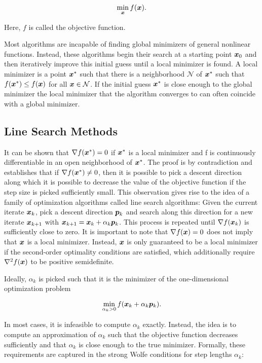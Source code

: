 \[
    \min_{\bm{x}} f(\bm{x}).
\]

\noindent Here, $f$ is called the objective function. 

Most algorithms are incapable of finding global minimizers of general nonlinear functions. 
Instead, these algorithms begin their search at a starting point $\bm{x}_0$ and then iteratively improve this initial guess until a local 
minimizer is found. A local minimizer is a point $\bm{x}^*$ such that there is a neighborhood $\mathcal{N}$ of 
$\bm{x}^*$ such that $f(\bm{x}^*) \leq f(\bm{x})$ for all $\bm{x} \in \mathcal{N}$. If the initial guess $\bm{x}^*$ is close enough 
to the global minimizer the local minimizer that the algorithm converges to can often coincide with a global minimizer. 

\subsection{Line Search Methods}\label{ss:line-search}
It can be shown that $\nabla f(\bm{x}^*) = 0$ if $\bm{x}^*$ is a local minimizer and f is continuously differentiable in an open neighborhood
of $\bm{x}^*$. The proof is by contradiction and establishes that if $\nabla f(\bm{x}^*) \neq 0$, then it is possible to pick a descent 
direction along which it is possible to decrease the value of the objective function if the step size is picked sufficiently small. This 
observation gives rise to the idea of a family of optimization algorithms called line search algorithms: Given the current 
iterate $\bm{x}_k$, pick a descent direction $\bm{p}_k$ and search along this direction for a new iterate $\bm{x}_{k+1}$ with $\bm{x}_{k+1} = 
\bm{x}_k + \alpha_k \bm{p}_k$. This process is repeated until $\nabla f(\bm{x}_k)$ is sufficiently close to zero. It is important to note that 
$\nabla f(\bm{x}) = 0$ does not imply that $\bm{x}$ is a local minimizer. Instead, $\bm{x}$ is only guaranteed to be a local minimizer if 
the second-order 
optimality conditions are satisfied, which additionally require $\nabla^2 f(\bm{x})$ to be positive semidefinite.

Ideally, $\alpha_k$ is picked such that it is the minimizer of the one-dimensional optimization problem

\[
    \min_{\alpha_k > 0} f(\bm{x}_k + \alpha_k \bm{p}_k).
\]

\noindent In most cases, it is infeasible to compute $\alpha_k$ exactly. Instead, the idea is to compute an approximation of $\alpha_k$ such that 
the objective function decreases sufficiently and that $\alpha_k$ is close enough to the true minimizer. Formally, these requirements
are captured in the strong Wolfe conditions for step lengths $\alpha_k$:

